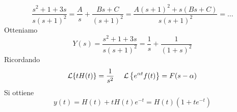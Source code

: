 \begin{equation*}
\frac{s^{2} + 1 + 3s}{s(s + 1)^{2}} = \frac{A}{s} + \frac{Bs + C}{(s + 1)^{2}} = \frac{A(s + 1)^{2} + s(Bs + C)}{s(s + 1)^{2}} = \dotsc 
\end{equation*}
Otteniamo
\begin{equation*}
Y(s) = \frac{s^{2} + 1 + 3s}{s(s + 1)^{2}} = \frac{1}{s} + \frac{1}{(1 + s)^{2}}
\end{equation*}
Ricordando
\begin{equation*}
\Lc\{tH(t)\} = \frac{1}{s^{2}} \ \ \ \ \Lc\left\{e^{\alpha t} f(t)\right\} = F(s - \alpha)
\end{equation*}
Si ottiene
\begin{equation*}
y(t) = H(t) + tH(t) e^{ - t} = H(t)\left(1 + te^{ - t}\right)
\end{equation*}
\Soluzione

